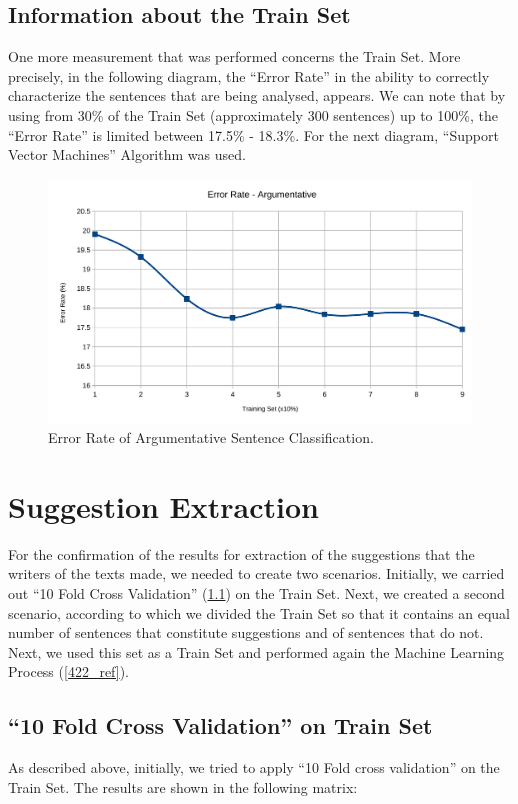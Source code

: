 \subsection{Information about the Train Set}\label{413_ref}
One more measurement that was performed concerns the Train Set. More precisely, in the following diagram, the ``Error Rate'' in the ability to correctly characterize the sentences that are being analysed, appears. We can note that by using from 30\% of the Train Set (approximately 300 sentences) up to 100\%, the ``Error Rate'' is limited between 17.5\% - 18.3\%. For the next diagram, ``Support Vector Machines'' Algorithm was used.

\begin{figure}[H]
\centering
\includegraphics[width=1\linewidth]{figure/arguments/errorRate-argumentative}
\caption{Error Rate of Argumentative Sentence Classification.}
\end{figure}

\section{Suggestion Extraction}\label{42_ref}
For the confirmation of the results for extraction of the suggestions that the writers of the texts made, we needed to create two scenarios. Initially, we carried out ``10 Fold Cross Validation'' (\ref{421_ref}) on the Train Set. Next, we created a second scenario, according to which we divided the Train Set so that it contains an equal number of sentences that constitute suggestions and of sentences that do not. Next, we used this set as a Train Set and performed again the Machine Learning Process (\ref{422_ref}).

\subsection{``10 Fold Cross Validation'' on Train Set}\label{421_ref}
As described above, initially, we tried to apply ``10 Fold cross validation'' on the  Train Set. The results are shown in the following matrix:

